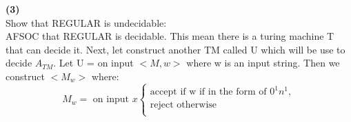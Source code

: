 \documentclass[a4paper, 11pt]{article}
\renewcommand{\part}[1] {\vspace{.10in} {\bf (#1)}}
\begin{document}
\part{3}\\
Show that REGULAR is undecidable:\\
AFSOC that REGULAR is decidable. This mean there is a turing machine T that can decide it. Next, let construct another TM called U which will be use to decide $A_{TM}$. Let U = on input $<M,w>$ where w is an input string. Then we construct $<M_w>$ where:\\
\[
\text{$M_w = $ on input $x$}
\left\{
\begin{matrix}
\text{accept if w if in the form of } 0^1n^1,\\ \text{reject otherwise }\\
\end{matrix}
\right.
\]\\
\end{document}
